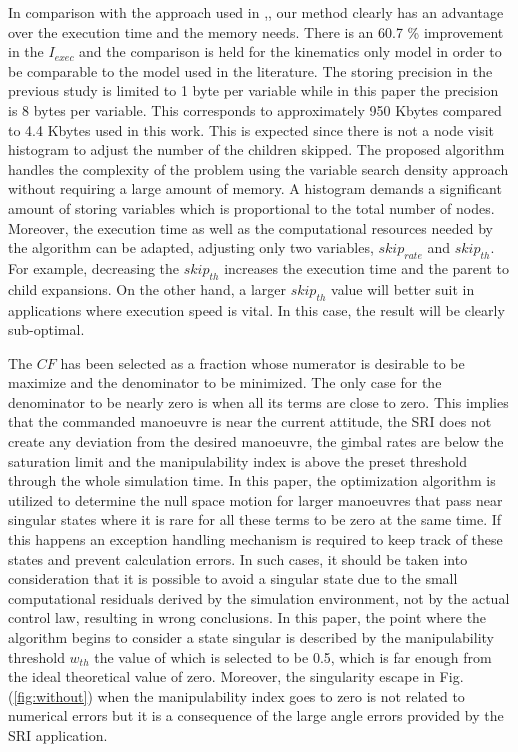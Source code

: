 \documentclass[journal]{new-aiaa}
\begin{document}
In comparison with the approach used in \cite{paradiso},\cite{paradiso2}, our method clearly has an advantage over the execution time and the memory needs. There is an 60.7 \% improvement in the $I_{exec}$ and the comparison is held for the kinematics only model in order to be comparable to the model used in the literature. The storing precision in the previous study is limited to 1 byte per variable while in this paper the precision is 8 bytes per variable. This corresponds to approximately 950 Kbytes compared to 4.4 Kbytes used in this work. This is expected since there is not a node visit histogram to adjust the number of the children skipped. The proposed algorithm handles the complexity of the problem using the variable search density approach without requiring a large amount of memory. A histogram demands a significant amount of storing variables which is proportional to the total number of nodes. Moreover, the execution time as well as the computational resources needed by the algorithm can be adapted, adjusting only two variables, ${skip}_{rate}$ and ${skip}_{th}$. For example, decreasing the ${skip}_{th}$  increases the execution time and the parent to child expansions. On the other hand, a larger ${skip}_{th}$ value will better suit in applications where execution speed is vital. In this case, the result will be clearly sub-optimal.

The  $CF$ has been selected as a fraction whose numerator is desirable to be maximize and the denominator to be minimized. The only case for the denominator to be nearly zero is when all its terms are close to zero. This implies that the commanded manoeuvre is near the current attitude, the SRI does not create any deviation from the desired manoeuvre, the gimbal rates are below the saturation limit and the manipulability index is above the preset threshold through the whole simulation time. In this paper, the optimization algorithm is utilized to determine the null space motion for larger manoeuvres that pass near singular states where it is rare for all these terms to be zero at the same time. If this happens an exception handling mechanism is required to keep track of these states and prevent calculation errors. In such cases, it should be taken into consideration that it is possible to avoid a singular state due to the small computational residuals derived by the simulation environment, not by the actual control law, resulting in wrong conclusions. In this paper,  the point where the algorithm begins to consider a state singular is described by the manipulability threshold $w_{th}$ the value of which is selected to be 0.5, which is far enough from the ideal theoretical value of zero. Moreover, the singularity escape in Fig.(\ref{fig:without}) when the manipulability index goes to zero  is not related to numerical errors but it is a consequence of the large angle errors provided by the SRI application.
\end{document}
